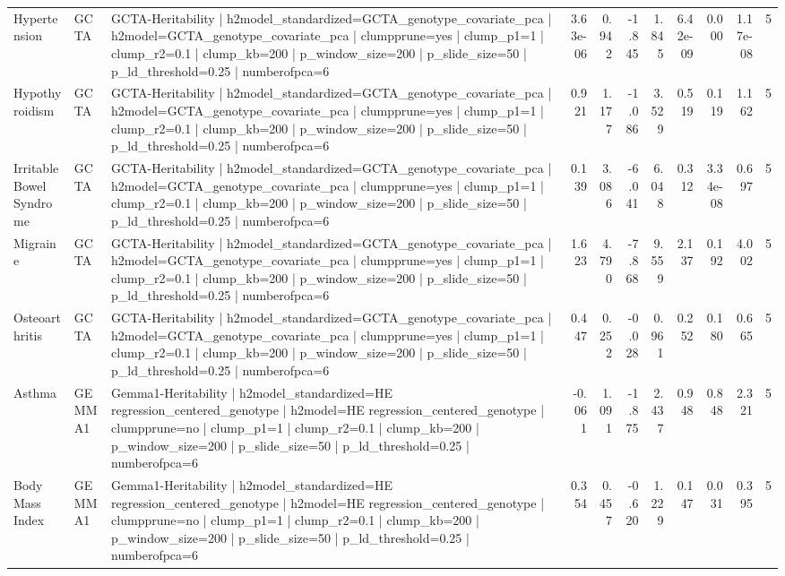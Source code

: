 \begin{landscape}
\begin{longtable}{p{2.4cm}p{1.8cm}p{6.0cm}rrrrrrrr}
Hypertension & GCTA & GCTA-Heritability | h2model\_standardized=GCTA\_genotype\_covariate\_pca | h2model=GCTA\_genotype\_covariate\_pca | clumpprune=yes | clump\_p1=1 | clump\_r2=0.1 | clump\_kb=200 | p\_window\_size=200 | p\_slide\_size=50 | p\_ld\_threshold=0.25 | numberofpca=6 & 3.63e-06 & 0.942 & -1.845 & 1.845 & 6.42e-09 & 0.000 & 1.17e-08 & 5 \\
Hypothyroidism & GCTA & GCTA-Heritability | h2model\_standardized=GCTA\_genotype\_covariate\_pca | h2model=GCTA\_genotype\_covariate\_pca | clumpprune=yes | clump\_p1=1 | clump\_r2=0.1 | clump\_kb=200 | p\_window\_size=200 | p\_slide\_size=50 | p\_ld\_threshold=0.25 | numberofpca=6 & 0.921 & 1.177 & -1.086 & 3.529 & 0.519 & 0.119 & 1.162 & 5 \\
Irritable Bowel Syndrome & GCTA & GCTA-Heritability | h2model\_standardized=GCTA\_genotype\_covariate\_pca | h2model=GCTA\_genotype\_covariate\_pca | clumpprune=yes | clump\_p1=1 | clump\_r2=0.1 | clump\_kb=200 | p\_window\_size=200 | p\_slide\_size=50 | p\_ld\_threshold=0.25 | numberofpca=6 & 0.139 & 3.086 & -6.041 & 6.048 & 0.312 & 3.34e-08 & 0.697 & 5 \\
Migraine & GCTA & GCTA-Heritability | h2model\_standardized=GCTA\_genotype\_covariate\_pca | h2model=GCTA\_genotype\_covariate\_pca | clumpprune=yes | clump\_p1=1 | clump\_r2=0.1 | clump\_kb=200 | p\_window\_size=200 | p\_slide\_size=50 | p\_ld\_threshold=0.25 | numberofpca=6 & 1.623 & 4.790 & -7.868 & 9.559 & 2.137 & 0.192 & 4.002 & 5 \\
Osteoarthritis & GCTA & GCTA-Heritability | h2model\_standardized=GCTA\_genotype\_covariate\_pca | h2model=GCTA\_genotype\_covariate\_pca | clumpprune=yes | clump\_p1=1 | clump\_r2=0.1 | clump\_kb=200 | p\_window\_size=200 | p\_slide\_size=50 | p\_ld\_threshold=0.25 | numberofpca=6 & 0.447 & 0.252 & -0.028 & 0.961 & 0.252 & 0.180 & 0.665 & 5 \\
Asthma & GEMMA1 & Gemma1-Heritability | h2model\_standardized=HE regression\_centered\_genotype | h2model=HE regression\_centered\_genotype | clumpprune=no | clump\_p1=1 | clump\_r2=0.1 | clump\_kb=200 | p\_window\_size=200 | p\_slide\_size=50 | p\_ld\_threshold=0.25 | numberofpca=6 & -0.061 & 1.091 & -1.875 & 2.437 & 0.948 & 0.848 & 2.321 & 5 \\
Body Mass Index & GEMMA1 & Gemma1-Heritability | h2model\_standardized=HE regression\_centered\_genotype | h2model=HE regression\_centered\_genotype | clumpprune=no | clump\_p1=1 | clump\_r2=0.1 | clump\_kb=200 | p\_window\_size=200 | p\_slide\_size=50 | p\_ld\_threshold=0.25 | numberofpca=6 & 0.354 & 0.457 & -0.620 & 1.229 & 0.147 & 0.031 & 0.395 & 5 \\

\end{longtable}
\end{landscape}
